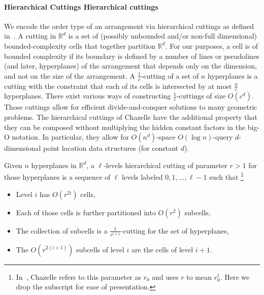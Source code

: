 \paragraph*{\iftitlecase%
Hierarchical Cuttings\else%
Hierarchical cuttings\fi}
We encode the order type of an arrangement via
hierarchical cuttings as defined in~\cite{C93}. A cutting in \(\mathbb{R}^d\)
is a set of (possibly unbounded and/or non-full dimensional)
bounded-complexity cells that together partition \(\mathbb{R}^{d}\).
%
For our purposes, a cell is of bounded complexity if its boundary is defined by
a number of lines or pseudolines (and later, hyperplanes) of the arrangement
that depends only on the dimension, and not on the size of the arrangement.
%
A \(\frac{1}{c}\)-cutting of a set of \(n\) hyperplanes is a cutting with the
constraint that each of its cells is intersected by at most \(\frac{n}{c}\)
hyperplanes. There exist various ways of constructing \(\frac{1}{c}\)-cuttings of
size \(O(c^d)\).
\ifeurocg\else%
Those cuttings allow for efficient divide-and-conquer
solutions to many geometric problems. The hierarchical cuttings of Chazelle
have the additional property that they can be composed without multiplying the
hidden constant factors in the big-O notation. In particular, they allow
for \(O(n^d)\)-space \(O(\log n)\)-query \(d\)-dimensional point location data
structures (for constant \(d\)).
\fi%
\ifjournal
  \begin{definition}
    Given \(n\) hyperplanes in \(\mathbb{R}^d\),
    a \(\ell\)-levels hierarchical cutting of parameter \(r > 1\)
    for those hyperplanes
    is a sequence of \(\ell\) levels labeled \(0,1, \ldots, \ell - 1\)
    such that%
    \footnote{In~\cite{C93}, Chazelle refers to this parameter as
    \(r_0\) and uses \(r\) to mean \(r_0^\ell\). Here we drop the subscript for
    ease of presentation.}
    \begin{itemize}
      \item Level \(i\) has \(O(r^{2i})\) cells,
      \item Each of those cells is further partitioned into \(O(r^2)\)
        subcells,
      \item The collection of subcells is a \(\frac{1}{r^{i+1}}\)-cutting for
        the set of hyperplanes,
      \item The \(O(r^{2(i+1)})\) subcells of level \(i\) are the cells of level \(i+1\).
    \end{itemize}
  \end{definition}
